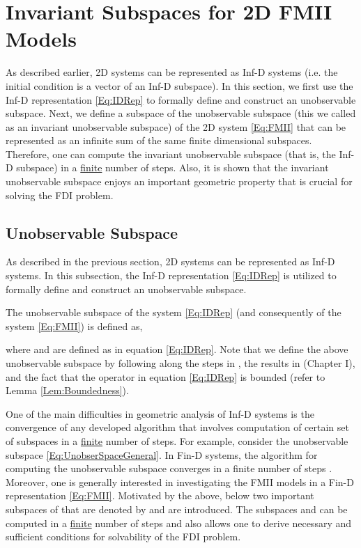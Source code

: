 \documentclass[journal,12pt,draftcls,onecolumn]{IEEEtran}
\newcommand{\infd}{Inf-D }
\begin{document}
\section{Invariant Subspaces for 2D FMII Models}\label{Sec:InvSpace}
As described earlier, 2D systems can be represented as \infd systems (i.e. the initial condition is a vector of an Inf-D subspace). In this section, we first use the Inf-D representation \eqref{Eq:IDRep} to formally define and construct an unobservable subspace. Next, we define a subspace of  the unobservable subspace  (this we called as an invariant unobservable subspace) of the 2D system \eqref{Eq:FMII} that can be represented as an infinite sum of the same finite dimensional subspaces. Therefore, one can compute the invariant unobservable subspace (that is, the \infd subspace) in a \underline{finite} number of steps. Also, it is shown that the invariant unobservable subspace enjoys an important geometric property that is crucial for solving the FDI problem.



\subsection{Unobservable Subspace}\label{Sec:UnObservable}




As described in the previous section, 2D systems can be represented as Inf-D systems. In this subsection, the Inf-D representation \eqref{Eq:IDRep} is utilized to formally define and construct an unobservable subspace.




The unobservable subspace of the system \eqref{Eq:IDRep} (and consequently of the system \eqref{Eq:FMII}) is defined as,

where  and  are defined as in equation \eqref{Eq:IDRep}. Note that we define the above unobservable subspace by following along the steps in \cite{Curtain_1986}, the results in \cite{Zwart_Book} (Chapter I), and the fact that the operator  in equation \eqref{Eq:IDRep} is bounded (refer to Lemma \ref{Lem:Boundedness}).

One of the main difficulties in geometric analysis of Inf-D systems is the convergence of any developed algorithm that involves computation of certain set of subspaces in a \underline{finite} number of steps. For example, consider the unobservable subspace \eqref{Eq:UnobserSpaceGeneral}. In Fin-D systems, the algorithm for computing the unobservable subspace converges in a finite number of steps \cite{Wonham_Book}. Moreover, one is generally interested in investigating the FMII models in a Fin-D representation \eqref{Eq:FMII}.  Motivated by the above, below two important subspaces of  that are denoted by  and  are introduced. The subspaces  and   can be computed in a \underline{finite} number of steps and also allows one to derive necessary and sufficient conditions for solvability of the FDI problem.
\end{document}
